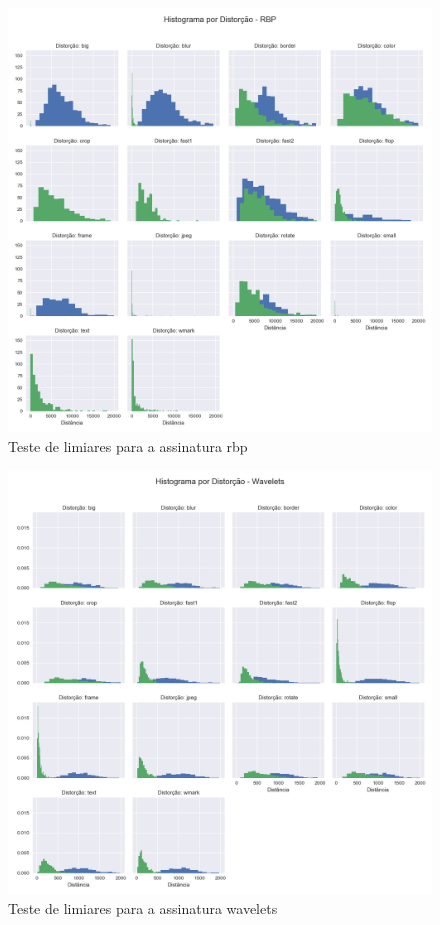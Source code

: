 \begin{figure}[h]
	\centering
	\label{fig:limiares-rbp}
	\caption{Teste de limiares para a assinatura rbp}
	\includegraphics[width=\textwidth]{dados/figuras/experimentos/histograma_distorcao_RBP.png}
\end{figure}
\begin{figure}[h]
	\centering
	\label{fig:limiares-wavelets}
	\caption{Teste de limiares para a assinatura wavelets}
	\includegraphics[width=\textwidth]{dados/figuras/experimentos/histograma_distorcao_Wavelets.png}
\end{figure}

